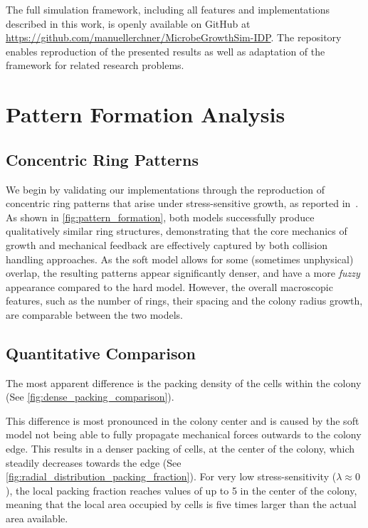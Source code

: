 \documentclass[conference]{IEEEtran}
\begin{document}
The full simulation framework, including all features and implementations described in this work, is openly available on GitHub at \url{https://github.com/manuellerchner/MicrobeGrowthSim-IDP}.
The repository enables reproduction of the presented results as well as adaptation of the framework for related research problems.

\section{Pattern Formation Analysis}

\subsection{Concentric Ring Patterns}

We begin by validating our implementations through the reproduction of concentric ring patterns that arise under stress-sensitive growth, as reported in~\cite{Weady2024}. As shown in \autoref{fig:pattern_formation}, both models successfully produce qualitatively similar ring structures, demonstrating that the core mechanics of growth and mechanical feedback are effectively captured by both collision handling approaches. As the soft model allows for some (sometimes unphysical) overlap, the resulting patterns appear significantly denser, and have a more \emph{fuzzy} appearance compared to the hard model. However, the overall macroscopic features, such as the number of rings, their spacing and the colony radius growth, are comparable between the two models.


\subsection{Quantitative Comparison}

The most apparent difference is the packing density of the cells within the colony (See \autoref{fig:dense_packing_comparison}).

This difference is most pronounced in the colony center and is caused by the soft model not being able to fully propagate mechanical forces outwards to the colony edge. This results in a denser packing of cells, at the center of the colony, which steadily decreases towards the edge (See \autoref{fig:radial_distribution_packing_fraction}). For very low stress-sensitivity ($\lambda \approx 0$), the local packing fraction reaches values of up to 5 in the center of the colony, meaning that the local area occupied by cells is five times larger than the actual area available.
\end{document}
